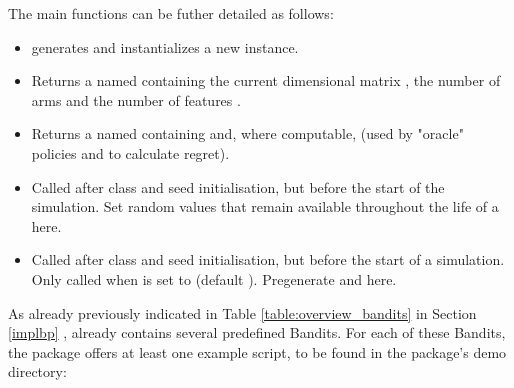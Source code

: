 \documentclass{jss}
\begin{document}
The main  functions can be futher detailed as follows:

\begin{itemize}
   \item{}{ generates and instantializes a new  instance. }

   \item{}{

      Returns a named 
      containing the current  dimensional matrix ,
      the number of arms  and the number of features .
  }

   \item{}{

      Returns a named  containing  and, where computable,
          (used by "oracle" policies and to calculate regret).
  }

   \item{}{
      Called after class and seed initialisation, but before the start of the simulation.
      Set random values that remain available throughout the life of a  here.
   }

   \item{}{
      Called after class and seed initialisation, but before the start of a simulation.
      Only called when  is set to  (default ).
      Pregenerate  and  here.
   }
\end{itemize}

As already previously indicated in Table \ref{table:overview_bandits} in Section \ref{implbp} ,  already contains several predefined Bandits. For each of these Bandits, the package offers at least one example script, to be found in the package’s demo directory:
\end{document}
